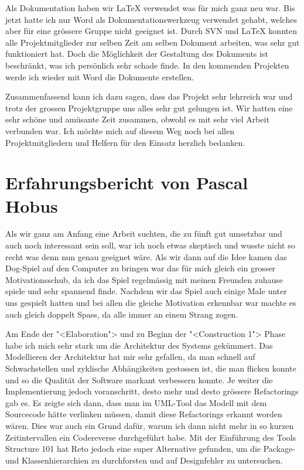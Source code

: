 \documentclass[12pt,halfparskip]{scrartcl}
\begin{document}
Als Dokumentation haben wir LaTeX verwendet was für mich ganz neu war. Bis jetzt hatte ich nur Word als Dokumentationswerkzeug verwendet gehabt, welches aber für eine grössere Gruppe nicht geeignet ist. Durch SVN und LaTeX konnten alle Projektmitglieder zur selben Zeit am selben Dokument arbeiten, was sehr gut funktioniert hat. Doch die Möglichkeit der Gestaltung des Dokuments ist beschränkt, was ich persönlich sehr schade finde. In den kommenden Projekten werde ich wieder mit Word die Dokumente erstellen.

Zusammenfassend kann ich dazu sagen, dass das Projekt sehr lehrreich war und trotz der grossen Projektgruppe uns alles sehr gut gelungen ist. Wir hatten eine sehr schöne und amüsante Zeit zusammen, obwohl es mit sehr viel Arbeit verbunden war. Ich möchte mich auf diesem Weg noch bei allen Projektmitgliedern und Helfern für den Einsatz herzlich bedanken.


\section{Erfahrungsbericht von Pascal Hobus}

Als wir ganz am Anfang eine Arbeit suchten, die zu fünft gut umsetzbar und auch noch interessant sein soll, war ich noch etwas skeptisch und wusste nicht so recht was denn nun genau geeignet wäre. Als wir dann auf die Idee kamen das Dog-Spiel auf den Computer zu bringen war das für mich gleich ein grosser Motivationsschub, da ich das Spiel regelmässig mit meinen Freunden zuhause spiele und sehr spannend finde. Nachdem wir das Spiel auch einige Male unter uns gespielt hatten und bei allen die gleiche Motivation erkennbar war machte es auch gleich doppelt Spass, da alle immer an einem Strang zogen.

Am Ende der "<Elaboration"> und zu Beginn der "<Construction 1"> Phase habe ich mich sehr stark um die Architektur des Systems gekümmert. Das Modellieren der Architektur hat mir sehr gefallen, da man schnell auf Schwachstellen und zyklische Abhängikeiten gestossen ist, die man flicken konnte und so die Qualität der Software markant verbessern konnte. Je weiter die Implementierung jedoch voranschritt, desto mehr und desto grössere Refactorings gab es. Es zeigte sich dann, dass man im UML-Tool das Modell mit dem Sourcecode hätte verlinken müssen, damit diese Refactorings erkannt worden wären. Dies war auch ein Grund dafür, warum ich dann nicht mehr in so kurzen Zeitintervallen ein Codereverse durchgeführt habe. Mit der Einführung des Tools Structure 101 hat Reto jedoch eine super Alternative gefunden, um die Package- und Klassenhierarchien zu durchforsten und auf Designfehler zu untersuchen.
\end{document}
